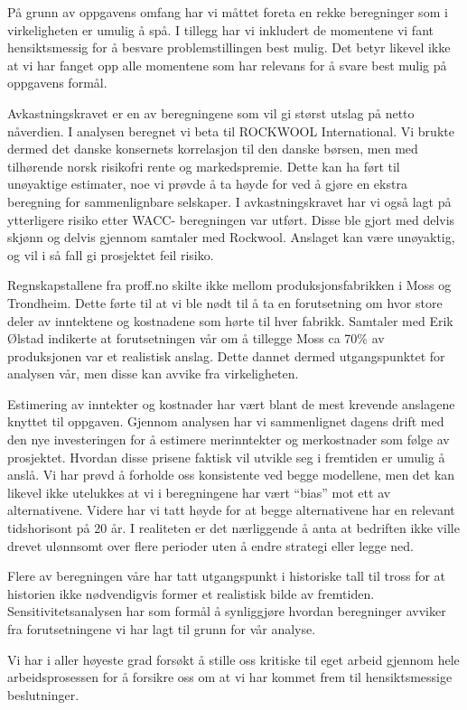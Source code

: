 På grunn av oppgavens omfang har vi måttet foreta en rekke beregninger som i virkeligheten er umulig å spå. I tillegg har vi inkludert de momentene vi fant hensiktsmessig for å besvare problemstillingen best mulig. Det betyr likevel ikke at vi har fanget opp alle momentene som har relevans for å svare best mulig på oppgavens formål. 

\indent \newline
Avkastningskravet er en av beregningene som vil gi størst utslag på netto nåverdien. I analysen beregnet vi beta til ROCKWOOL International. Vi brukte dermed det danske konsernets korrelasjon til den danske børsen, men med tilhørende norsk risikofri rente og markedspremie. Dette kan ha ført til unøyaktige estimater, noe vi prøvde å ta høyde for ved å gjøre en ekstra beregning for sammenlignbare selskaper. I avkastningskravet har vi også lagt på ytterligere risiko etter WACC- beregningen var utført. Disse ble gjort med delvis skjønn og delvis gjennom samtaler med Rockwool. Anslaget kan være unøyaktig, og vil i så fall gi prosjektet feil risiko. 

\indent \newline
Regnskapstallene fra proff.no skilte ikke mellom produksjonsfabrikken i Moss og Trondheim. Dette førte til at vi ble nødt til å ta en forutsetning om hvor store deler av inntektene og kostnadene som hørte til hver fabrikk. Samtaler med Erik Ølstad indikerte at forutsetningen vår om å tillegge Moss ca 70\% av produksjonen var et realistisk anslag. Dette dannet dermed utgangspunktet for analysen vår, men disse kan avvike fra virkeligheten.

\indent \newline
Estimering av inntekter og kostnader har vært blant de mest krevende anslagene knyttet til oppgaven. Gjennom analysen har vi sammenlignet dagens drift med den nye investeringen for å estimere merinntekter og merkostnader som følge av prosjektet. Hvordan disse prisene faktisk vil utvikle seg i fremtiden er umulig å anslå. Vi har prøvd å forholde oss konsistente ved begge modellene, men det kan likevel ikke utelukkes at vi i beregningene har vært “bias” mot ett av alternativene. Videre har vi tatt høyde for at begge alternativene har en relevant tidshorisont på 20 år. I realiteten er det nærliggende å anta at bedriften ikke ville drevet ulønnsomt over flere perioder uten å endre strategi eller legge ned. 

\indent \newline
Flere av beregningen våre har tatt utgangspunkt i historiske tall til tross for at historien ikke nødvendigvis former et realistisk bilde av fremtiden. Sensitivitetsanalysen har som formål å synliggjøre hvordan beregninger avviker fra forutsetningene vi har lagt til grunn for vår analyse. 

\indent \newline
Vi har i aller høyeste grad forsøkt å stille oss kritiske til eget arbeid gjennom hele arbeidsprosessen for å forsikre oss om at vi har kommet frem til hensiktsmessige beslutninger. 
